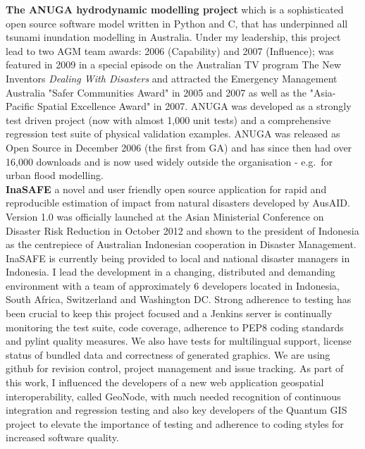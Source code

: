 \documentclass[10pt,a4paper]{article}
\begin{document}
\noindent \textbf{The ANUGA hydrodynamic modelling project} which is a sophisticated open source software model written in Python and C, that has underpinned all tsunami inundation modelling in Australia. Under my leadership, this project lead to two AGM team awards: 2006 (Capability) and 2007 (Influence); was featured in 2009 in a special episode on the Australian TV program The New Inventors \emph{Dealing With Disasters} and attracted the Emergency Management Australia "Safer Communities Award" in 2005 and 2007 as well as the "Asia-Pacific Spatial Excellence Award" in 2007. ANUGA was developed as a strongly test driven project (now with almost 1,000 unit tests) and a comprehensive regression test suite of physical validation examples. ANUGA was released as Open Source in December 2006 (the first from GA) and has since then had over 16,000 downloads and is now used widely outside the organisation - e.g.\ for urban flood modelling.\\

\noindent \textbf{InaSAFE} a novel and user friendly open source application for rapid and reproducible estimation of impact from natural disasters developed by AusAID. Version 1.0 was officially launched at the Asian Ministerial Conference on Disaster Risk Reduction in October 2012 and shown to the president of Indonesia as the centrepiece of Australian Indonesian cooperation in Disaster Management. InaSAFE is currently being provided to local and national disaster managers in Indonesia.
I lead the development in a changing, distributed and demanding environment with a team of approximately 6 developers located in Indonesia, South Africa, Switzerland and Washington DC. Strong adherence to testing has been crucial to keep this project focused and a Jenkins server is continually monitoring the test suite, code coverage, adherence to PEP8 coding standards and pylint quality measures. We also have tests for multilingual support, license status of bundled data and correctness of generated graphics. We are using github for revision control, project management and issue tracking. As part of this work, I influenced the developers of a new web application geospatial interoperability, called \mbox{GeoNode}, with much needed recognition of continuous integration and regression testing and also key developers of the Quantum GIS project to elevate the importance of testing and adherence to coding styles for increased software quality.\\
\end{document}

